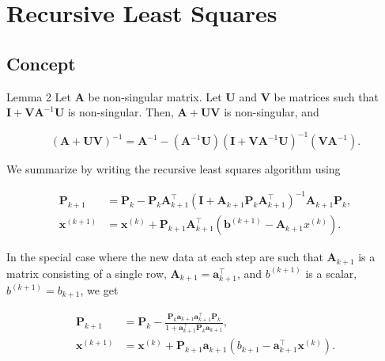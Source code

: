 \section{Recursive Least Squares}

\subsection{Concept}
Lemma 2 Let \(\boldsymbol{A}\) be non-singular matrix. Let \(\boldsymbol{U}\) and \(\boldsymbol{V}\) be matrices such that \(\boldsymbol{I}+\boldsymbol{V} \boldsymbol{A}^{-1} \boldsymbol{U}\) is non-singular. Then, \(\boldsymbol{A}+\boldsymbol{U} \boldsymbol{V}\) is non-singular, and

\[
	(\boldsymbol{A}+\boldsymbol{U} \boldsymbol{V})^{-1}=\boldsymbol{A}^{-1}-\left(\boldsymbol{A}^{-1} \boldsymbol{U}\right)\left(\boldsymbol{I}+\boldsymbol{V} \boldsymbol{A}^{-1} \boldsymbol{U}\right)^{-1}\left(\boldsymbol{V} \boldsymbol{A}^{-1}\right) .
\]

We summarize by writing the recursive least squares algorithm using

\[
	\begin{aligned}
		\boldsymbol{P}_{k+1} & =\boldsymbol{P}_{k}-\boldsymbol{P}_{k} \boldsymbol{A}_{k+1}^{\top}\left(\boldsymbol{I}+\boldsymbol{A}_{k+1} \boldsymbol{P}_{k} \boldsymbol{A}_{k+1}^{\top}\right)^{-1} \boldsymbol{A}_{k+1} \boldsymbol{P}_{k}, \\
		\boldsymbol{x}^{(k+1)} & =\boldsymbol{x}^{(k)}+\boldsymbol{P}_{k+1} \boldsymbol{A}_{k+1}^{\top}\left(\boldsymbol{b}^{(k+1)}-\boldsymbol{A}_{k+1} x^{(k)}\right) .
	\end{aligned}
\]

In the special case where the new data at each step are such that \(\boldsymbol{A}_{k+1}\) is a matrix consisting of a single row, \(\boldsymbol{A}_{k+1}=\boldsymbol{a}_{k+1}^{\top}\), and \(b^{(k+1)}\) is a scalar, \(b^{(k+1)}=b_{k+1}\), we get

\[
	\begin{aligned}
		\boldsymbol{P}_{k+1} & =\boldsymbol{P}_{k}-\frac{\boldsymbol{P}_{k} \boldsymbol{a}_{k+1} \boldsymbol{a}_{k+1}^{\top} \boldsymbol{P}_{k}}{1+\boldsymbol{a}_{k+1}^{\top} \boldsymbol{P}_{k} \boldsymbol{a}_{k+1}}, \\
		\boldsymbol{x}^{(k+1)} & =\boldsymbol{x}^{(k)}+\boldsymbol{P}_{k+1} \boldsymbol{a}_{k+1}\left(b_{k+1}-\boldsymbol{a}_{k+1}^{\top} \boldsymbol{x}^{(k)}\right) .
	\end{aligned}
\]


